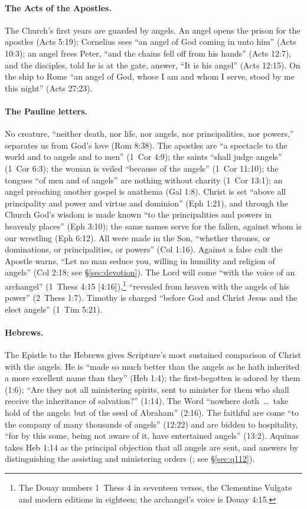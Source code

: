 \paragraph{The Acts of the Apostles.} The Church's first years are
guarded by angels. An angel opens the prison for the apostles (Acts 5:19);
Cornelius sees ``an angel of God coming in unto him'' (Acts 10:3); an
angel frees Peter, ``and the chains fell off from his hands'' (Acts 12:7),
and the disciples, told he is at the gate, answer, ``It is his angel''
(Acts 12:15). On the ship to Rome ``an angel of God, whose I am and whom I
serve, stood by me this night'' (Acts 27:23).

\paragraph{The Pauline letters.} No creature, ``neither death, nor life,
nor angels, nor principalities, nor powers,'' separates us from God's love
(Rom 8:38). The apostles are ``a spectacle to the world and to angels and
to men'' (1~Cor 4:9); the saints ``shall judge angels'' (1~Cor 6:3); the
woman is veiled ``because of the angels'' (1~Cor 11:10); the tongues ``of
men and of angels'' are nothing without charity (1~Cor 13:1); an angel
preaching another gospel is anathema (Gal 1:8). Christ is set ``above all
principality and power and virtue and dominion'' (Eph 1:21), and through
the Church God's wisdom is made known ``to the principalities and powers
in heavenly places'' (Eph 3:10); the same names serve for the fallen,
against whom is our wrestling (Eph 6:12). All were made in the Son,
``whether thrones, or dominations, or principalities, or powers'' (Col
1:16). Against a false cult the Apostle warns, ``Let no man seduce you,
willing in humility and religion of angels'' (Col 2:18; see
\S\ref{sec:devotion}). The Lord will come ``with the voice of an archangel''
(1~Thess 4:15 [4:16]),\footnote{The Douay numbers 1~Thess 4 in seventeen
verses, the Clementine Vulgate and modern editions in eighteen; the
archangel's voice is Douay 4:15.} ``revealed from heaven with the angels
of his power'' (2~Thess 1:7). Timothy is charged ``before God and Christ
Jesus and the elect angels'' (1~Tim 5:21).

\paragraph{Hebrews.} The Epistle to the Hebrews gives Scripture's most
sustained comparison of Christ with the angels. He is ``made so much
better than the angels as he hath inherited a more excellent name than
they'' (Heb 1:4); the first-begotten is adored by them (1:6); ``Are they
not all ministering spirits, sent to minister for them who shall receive
the inheritance of salvation?'' (1:14). The Word ``nowhere doth~\dots\
take hold of the angels: but of the seed of Abraham'' (2:16). The faithful
are come ``to the company of many thousands of angels'' (12:22) and are
bidden to hospitality, ``for by this some, being not aware of it, have
entertained angels'' (13:2). Aquinas takes Heb 1:14 as the principal
objection that all angels are sent, and answers by distinguishing the
assisting and ministering orders (\ST{I q.~112 aa.~2--4}; see
\S\ref{sec:q112}).

